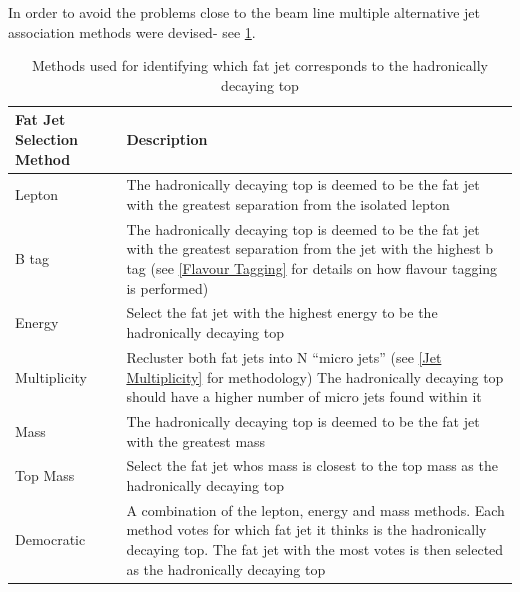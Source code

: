 In order to avoid the problems close to the beam line multiple alternative jet association methods were devised- see \ref{fig:methodDescription}.
\begin{table}
  \centering
  \begin{tabular}{l |p{120mm}}
    \toprule
    Fat Jet Selection Method     & Description  \\
    \midrule
    Lepton & The hadronically decaying top is deemed to be the fat jet with the greatest separation from the isolated lepton\\
    \midrule
    B tag & The hadronically decaying top is deemed to be the fat jet with the greatest separation from the jet with the highest b tag (see \ref{Flavour Tagging} for details on how flavour tagging is performed)\\
    \midrule
    Energy & Select the fat jet with the highest energy to be the hadronically decaying top\\
    \midrule
    Multiplicity & Recluster both fat jets into N ``micro jets'' (see \ref{Jet Multiplicity} for methodology) The hadronically decaying top should have a higher number of micro jets found within it\\
    \midrule
    Mass & The hadronically decaying top is deemed to be the fat jet with the greatest mass \\
    \midrule
    Top Mass & Select the fat jet whos mass is closest to the top mass as the hadronically decaying top\\
    \midrule
    Democratic & A combination of the lepton, energy and mass methods. Each method votes for which fat jet it thinks is the hadronically decaying top. The fat jet with the most votes is then selected as the hadronically decaying top  \\
    \bottomrule
  \end{tabular}
  \caption{Methods used for identifying which fat jet corresponds to the hadronically decaying top}
  \label{fig:methodDescription}
\end{table}

